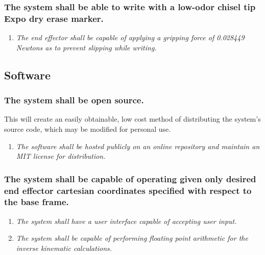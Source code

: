 \documentclass[12pt]{report}
\begin{document}
\subsubsection{The system shall be able to write with a low-odor chisel tip Expo dry erase marker.}
\begin{enumerate}[label=\thesubsubsection.\alph*,leftmargin=3cm,font=\itshape]
  \item \textit{The end effector shall be capable of applying a gripping force of 0.028449 Newtons as to prevent slipping while writing.}
\end{enumerate}

\subsection{Software}
\subsubsection{The system shall be open source.}
This will create an easily obtainable, low cost method of distributing the system’s source code, which may be modified for personal use.
\begin{enumerate}[label=\thesubsubsection.\alph*,leftmargin=3cm,font=\itshape]
  \item \textit{The software shall be hosted publicly on an online repository and maintain an MIT license for distribution.}
\end{enumerate}
\subsubsection{The system shall be capable of operating given only desired end effector cartesian coordinates specified with respect to the base frame.}
\begin{enumerate}[label=\thesubsubsection.\alph*,leftmargin=3cm,font=\itshape]
  \item \textit{The system shall have a user interface capable of accepting user input.}
  \item \textit{The system shall be capable of performing floating point arithmetic for the inverse kinematic calculations.}
\end{enumerate}
\end{document}

